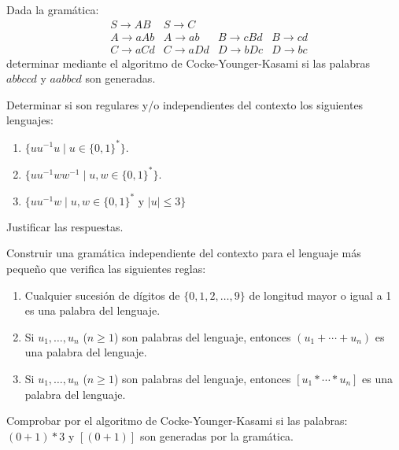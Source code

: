 \begin{ejercicio}\label{ej:1.6.8}
    Dada la gramática:
    \begin{equation*}
        \begin{array}{lllll}
            &S\rightarrow AB &S\rightarrow C & & \\
            &A\rightarrow aAb &A\rightarrow ab &B\rightarrow cBd &B\rightarrow cd \\
            &C\rightarrow aCd &C\rightarrow aDd &D\rightarrow bDc &D\rightarrow bc
        \end{array}
    \end{equation*}
    determinar mediante el algoritmo de Cocke-Younger-Kasami si las palabras $abbccd$ y $aabbcd$ son generadas.
\end{ejercicio}

\begin{ejercicio}\label{ej:1.6.9}
    Determinar si son regulares y/o independientes del contexto los siguientes lenguajes:
    \begin{enumerate}
        \item $\{uu^{-1}u \mid u\in {\{0,1\}}^{\ast}\}$.
        \item $\{uu^{-1}ww^{-1}\mid u,w\in {\{0,1\}}^{\ast}\}$.
        \item $\{uu^{-1}w \mid u,w\in {\{0,1\}}^{\ast} \text{\ y\ } |u|\leq 3\}$
    \end{enumerate}
    Justificar las respuestas.
\end{ejercicio}

\begin{ejercicio}\label{ej:1.6.10}
    Construir una gramática independiente del contexto para el lenguaje más pequeño que verifica las siguientes reglas:
    \begin{enumerate}
        \item Cualquier sucesión de dígitos de $\{0,1,2,\ldots, 9\}$ de longitud mayor o igual a 1 es una palabra del lenguaje.
        \item Si $u_1,\ldots,u_n$ ($n\geq 1$) son palabras del lenguaje, entonces $(u_1+\cdots + u_n)$ es una palabra del lenguaje.
        \item Si $u_1,\ldots,u_n$ ($n\geq 1$) son palabras del lenguaje, entonces $[u_1 \ast \cdots \ast u_n]$ es una palabra del lenguaje.
    \end{enumerate}
    Comprobar por el algoritmo de Cocke-Younger-Kasami si las palabras: $(0+1)*3$ y $[(0+1)]$ son generadas por la gramática.
\end{ejercicio}

